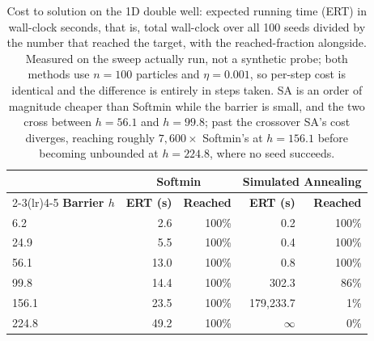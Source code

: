 \documentclass{article}
\theoremstyle{plain}
\theoremstyle{definition}
\theoremstyle{remark}
\begin{document}
\begin{table}[!htbp]
\centering
\caption{Cost to solution on the 1D double well: expected running time (ERT) in wall-clock seconds, that is, total wall-clock over all 100 seeds divided by the number that reached the target, with the reached-fraction alongside. Measured on the sweep actually run, not a synthetic probe; both methods use $n=100$ particles and $\eta=0.001$, so per-step cost is identical and the difference is entirely in steps taken. SA is an order of magnitude cheaper than Softmin while the barrier is small, and the two cross between $h=56.1$ and $h=99.8$; past the crossover SA's cost diverges, reaching roughly $7{,}600\times$ Softmin's at $h=156.1$ before becoming unbounded at $h=224.8$, where no seed succeeds.}
\label{tab:cost_to_solution}
\begin{tabular}{@{}lrrrr@{}}
\toprule
& \multicolumn{2}{c}{\textbf{Softmin}} & \multicolumn{2}{c}{\textbf{Simulated Annealing}} \\
\cmidrule(lr){2-3}\cmidrule(lr){4-5}
\textbf{Barrier $h$} & \textbf{ERT (s)} & \textbf{Reached} & \textbf{ERT (s)} & \textbf{Reached} \\
\midrule
6.2   & 2.6  & 100\% & 0.2                & 100\% \\
24.9  & 5.5  & 100\% & 0.4                & 100\% \\
56.1  & 13.0 & 100\% & 0.8                & 100\% \\
99.8  & 14.4 & 100\% & 302.3              & 86\%  \\
156.1 & 23.5 & 100\% & 179{,}233.7        & 1\%   \\
224.8 & 49.2 & 100\% & $\infty$           & 0\%   \\
\bottomrule
\end{tabular}
\end{table}
\end{document}
